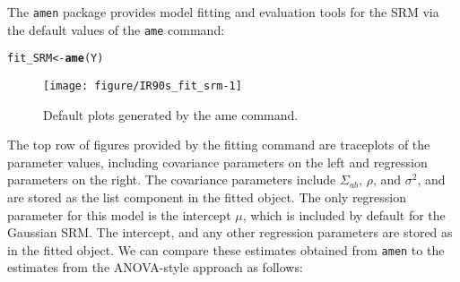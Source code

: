 \documentclass[11pt]{article}\usepackage[]{graphicx}\usepackage[]{color}
\makeatletter
\def\maxwidth{ %
  \ifdim\Gin@nat@width>\linewidth
    \linewidth
  \else
    \Gin@nat@width
  \fi
}
\newcommand{\hlstd}[1]{\textcolor[rgb]{0.345,0.345,0.345}{#1}}%
\newcommand{\hlkwb}[1]{\textcolor[rgb]{0.69,0.353,0.396}{#1}}%
\newcommand{\hlkwd}[1]{\textcolor[rgb]{0.737,0.353,0.396}{\textbf{#1}}}%
\newenvironment{kframe}{%
 \def\at@end@of@kframe{}%
 \ifinner\ifhmode%
  \def\at@end@of@kframe{\end{minipage}}%
  \begin{minipage}{\columnwidth}%
 \fi\fi%
 \def\FrameCommand##1{\hskip\@totalleftmargin \hskip-\fboxsep
 \colorbox{shadecolor}{##1}\hskip-\fboxsep
     \hskip-\linewidth \hskip-\@totalleftmargin \hskip\columnwidth}%
 \MakeFramed {\advance\hsize-\width
   \@totalleftmargin\z@ \linewidth\hsize
   \@setminipage}}%
 {\par\unskip\endMakeFramed%
 \at@end@of@kframe}
\newenvironment{knitrout}{}{} %
\makeatother
\begin{document}
The {\tt amen} package provides model fitting and evaluation tools 
for the SRM via the default values of the  {\tt ame} command:
\begin{knitrout}\footnotesize
{}\color{fgcolor}\begin{kframe}
\begin{alltt}
\hlstd{fit_SRM}\hlkwb{<-}\hlkwd{ame}\hlstd{(Y)}
\end{alltt}
\end{kframe}\begin{figure}

{\centering \texttt{[image: figure/IR90s\_fit\_srm-1]} 

}

\caption[Default plots generated by the ame command]{Default plots generated by the ame command.}\label{fig:IR90s_fit_srm}
\end{figure}


\end{knitrout}
The top row of
figures provided by the fitting command are traceplots of the
parameter values, including covariance parameters on the
left and regression parameters on the right.
The covariance parameters include $\Sigma_{ab}$,
$\rho$, and $\sigma^2$, and are stored as
the list component  in the fitted object.
The only regression parameter for this model is the
intercept $\mu$, which is included by default for the Gaussian SRM.
The intercept, and any other regression parameters are
stored as  in the fitted object.
We can compare these estimates obtained from {\tt amen}
to the estimates from the
ANOVA-style approach as follows:
\end{document}
